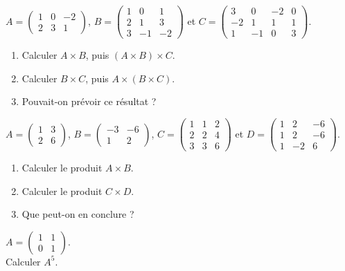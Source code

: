 \documentclass[a4paper,12pt,french]{article}
\begin{document}

\begin{exercice}[]
$A=\begin{pmatrix}
1&0&-2\\
2&3&1
\end{pmatrix}$,
$B=\begin{pmatrix}
1&0&1\\
2&1&3\\
3&-1&-2
\end{pmatrix}$ et
$C=\begin{pmatrix}
3&0&-2&0\\
-2&1&1&1\\
1&-1&0&3
\end{pmatrix}$.\\

\begin{enumerate}[\bfseries 1.]
	\item 	Calculer $A\times B$, puis $(A\times B)\times C$.
    \item 	Calculer $B\times C$, puis $A\times(B\times C)$.
    \item   Pouvait-on prévoir ce résultat ?\\
\end{enumerate}
\end{exercice}

\begin{exercice}
 $A=\begin{pmatrix}
 1&3\\
 2&6
 \end{pmatrix}$,
 $B=\begin{pmatrix}
 -3&-6\\
 1&2
 \end{pmatrix}$,
 $C=\begin{pmatrix}
 1&1&2\\
 2&2&4\\
 3&3&6
 \end{pmatrix}$ et
 $D=\begin{pmatrix}
 1&2&-6\\
 1&2&-6\\
 1&-2&6
 \end{pmatrix}$.

 \begin{enumerate}[\bfseries 1.]
 	\item 	Calculer le produit $A\times B$.
 	\item 	Calculer le produit $C\times D$.
     \item  Que peut-on en conclure ?
 \end{enumerate}

\end{exercice}


\begin{exercice}[ ]

$A=\begin{pmatrix}
1&1\\
0&1
\end{pmatrix}$.\\

Calculer $A^5$.
\end{exercice}
\end{document}
